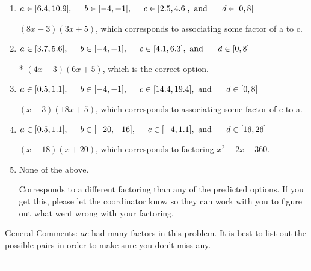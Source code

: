 \documentclass{extbook}[14pt]
\begin{document}
\begin{enumerate}[label=\Alph*.] 
\item $ a \in [6.4, 10.9], \hspace*{5mm} b \in [-4, -1], \hspace*{5mm} c \in [2.5, 4.6], \text{ and } \hspace*{5mm} d \in [0, 8] $ 

  $(8x -3)(3x + 5)$, which corresponds to associating some factor of a to c. 
\item $ a \in [3.7, 5.6], \hspace*{5mm} b \in [-4, -1], \hspace*{5mm} c \in [4.1, 6.3], \text{ and } \hspace*{5mm} d \in [0, 8] $ 

 * $(4x -3)(6x + 5)$, which is the correct option. 
\item $ a \in [0.5, 1.1], \hspace*{5mm} b \in [-4, -1], \hspace*{5mm} c \in [14.4, 19.4], \text{ and } \hspace*{5mm} d \in [0, 8] $ 

  $(x -3)(18x + 5)$, which corresponds to associating some factor of c to a. 
\item $ a \in [0.5, 1.1], \hspace*{5mm} b \in [-20, -16], \hspace*{5mm} c \in [-4, 1.1], \text{ and } \hspace*{5mm} d \in [16, 26] $ 

  $(x -18)(x + 20)$, which corresponds to factoring $x^{2} +2 x -360$. 
\item $ \text{None of the above.} $ 

  Corresponds to a different factoring than any of the predicted options. If you get this, please let the coordinator know so they can work with you to figure out what went wrong with your factoring. 
\end{enumerate} 
 
General Comments: $ac$ had many factors in this problem. It is best to list out the possible pairs in order to make sure you don't miss any.

-----------------------------------------------
\end{document}
